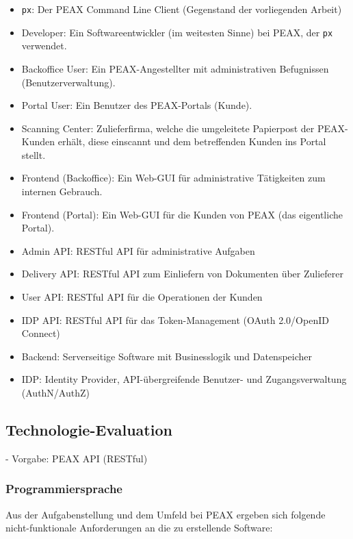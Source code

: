 \begin{itemize}
	\item \texttt{px}: Der PEAX Command Line Client (Gegenstand der vorliegenden Arbeit)
	\item Developer: Ein Softwareentwickler (im weitesten Sinne) bei PEAX, der \texttt{px} verwendet.
	\item Backoffice User: Ein PEAX-Angestellter mit administrativen Befugnissen (Benutzerverwaltung).
	\item Portal User: Ein Benutzer des PEAX-Portals (Kunde).
	\item Scanning Center: Zulieferfirma, welche die umgeleitete Papierpost der PEAX-Kunden erhält, diese einscannt und dem betreffenden Kunden ins Portal stellt.
	\item Frontend (Backoffice): Ein Web-GUI für administrative Tätigkeiten zum internen Gebrauch.
	\item Frontend (Portal): Ein Web-GUI für die Kunden von PEAX (das eigentliche Portal).
	\item Admin API: RESTful API für administrative Aufgaben
	\item Delivery API: RESTful API zum Einliefern von Dokumenten über Zulieferer
	\item User API: RESTful API für die Operationen der Kunden
	\item IDP API: RESTful API für das Token-Management (OAuth 2.0/OpenID Connect)
	\item Backend: Serverseitige Software mit Businesslogik und Datenspeicher
	\item IDP: Identity Provider, API-übergreifende Benutzer- und Zugangsverwaltung (AuthN/AuthZ)
\end{itemize}

\subsection{Technologie-Evaluation}

- Vorgabe: PEAX API (RESTful)

\subsubsection{Programmiersprache}

Aus der Aufgabenstellung und dem Umfeld bei PEAX ergeben sich folgende nicht-funktionale Anforderungen an die zu erstellende Software:


